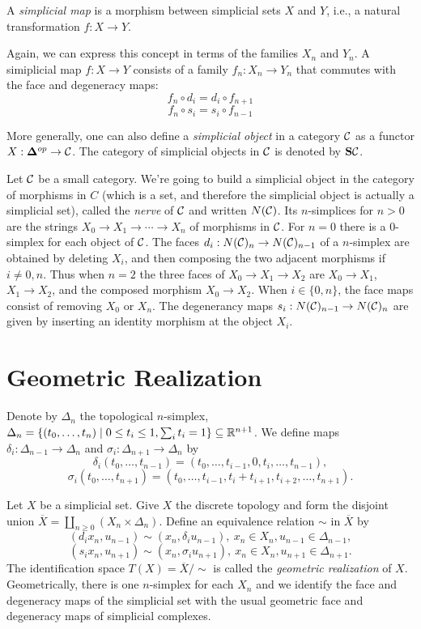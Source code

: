\documentclass[TFM.tex]{subfiles}
\begin{document}
\begin{defi}
A \emph{simplicial map} is a morphism between simplicial sets $X$ and $Y$, i.e., a natural transformation $f: X\to Y$.
\end{defi}

Again, we can express this concept in terms of the families $X_n$ and $Y_n$. A simiplicial map $f:X\to Y$ consists of a family $f_n:X_n\to Y_n$ that commutes with the face and degeneracy maps:
\[f_n\circ d_i=d_i\circ f_{n+1}\]
\[f_n\circ s_i=s_i\circ f_{n-1}\]

More generally, one can also define a \emph{simplicial object} in a category $\mathcal{C}$ as a functor $X:\mathbf{\Delta}^{op}\to\mathcal{C}$. The category of simplicial objects in $\mathcal{C}$ is denoted by $\mathrm{\mathbf{S}\mathcal{C}}$. 
\begin{ex}
Let $\mathcal{C}$ be a small category. We're going to build a simplicial object in the category of morphisms in $C$ (which is a set, and therefore the simplicial object is actually a simplicial set), called the \emph{nerve} of $\mathcal{C}$ and written $N(\mathcal{C})$. Its $n$-simplices for $n>0$ are the strings $X_0→X_1→\cdots →X_n$ of morphisms in $\mathcal{C}$. For $n=0$ there is a $0$-simplex for each object of $\mathcal{C}$. The faces $d_i:N(\mathcal{C})_n\to N(\mathcal{C})_{n-1}$ of a $n$-simplex are obtained by deleting $X_i$, and then composing the two adjacent morphisms if $i ≠ 0,n$. Thus when $n = 2$ the three faces of
$X_0→X_1→X_2$ are $X_0→X_1$, $X_1→X_2$, and the composed morphism $X_0→X_2$. When $i\in \{0,n\}$, the face maps consist of removing $X_0$ or $X_n$.
The degenerancy maps $s_i:N(\mathcal{C})_{n-1}\to N(\mathcal{C})_n$ are given by inserting an identity morphism at the object $X_i$. 

\end{ex}




\section{Geometric Realization}

Denote by $\Delta_n$ the topological $n$-simplex, $\Delta_n=\{(t_0,\dots, t_n)\mid 0\leq t_i\leq 1, \sum_i t_i=1\}\subseteq\mathbb{R}^{n+1}$. We define maps $\delta_i:\Delta_{n-1}\to\Delta_n$ and $\sigma_i:\Delta_{n+1}\to\Delta_n$ by
\[
\delta_i(t_0,\dots, t_{n-1})=(t_0,\dots, t_{i-1},0,t_i,\dots, t_{n-1}),
\]
\[\sigma_i(t_0,\dots, t_{n+1})=(t_0,\dots, t_{i-1},t_i+t_{i+1},t_{i+2},\dots, t_{n+1}).\]

Let $X$ be a simplicial set. Give $X$ the discrete topology and form the disjoint union $\overline{X}=\coprod_{n\geq 0}(X_n\times\Delta_n)$. Define an equivalence relation $\sim$ in $\overline{X}$ by
\[(d_ix_n,u_{n-1})\sim(x_n,\delta_i u_{n-1}),\ x_n\in X_n, u_{n-1}\in\Delta_{n-1},\]
\[(s_ix_n,u_{n+1})\sim(x_n,\sigma_iu_{n+1}),\ x_n\in X_n, u_{n+1}\in\Delta_{n+1}.\]
The identification space $T(X)=\overline{X}/\sim$ is called the \emph{geometric realization} of $X$. Geometrically, there is one $n$-simplex for each $X_n$ and we identify the face and degeneracy maps of the simplicial set with the usual geometric face and degeneracy maps of simplicial complexes. 
\end{document}
